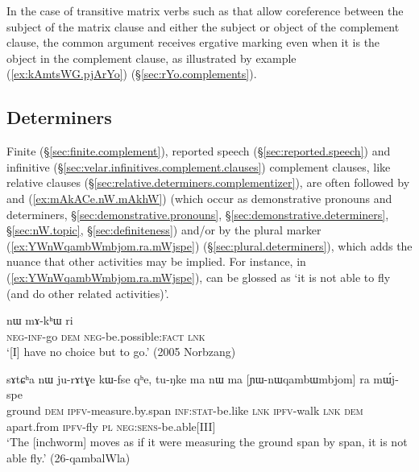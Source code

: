 In the case of transitive matrix verbs such as  that allow coreference between the subject of the matrix clause and either the subject or object of the complement clause, the common argument receives ergative marking even when it is the object in the complement clause, as illustrated by example (\ref{ex:kAmtsWG.pjArYo}) (§\ref{sec:rYo.complements}).

\subsection{Determiners} \label{sec:complement.determiner}
 
Finite (§\ref{sec:finite.complement}), reported speech (§\ref{sec:reported.speech}) and infinitive (§\ref{sec:velar.infinitives.complement.clauses}) complement clauses, like relative clauses (§\ref{sec:relative.determiners.complementizer}), are often followed by  and  (\ref{ex:mAkACe.nW.mAkhW})  (which occur as  demonstrative pronouns and determiners, §\ref{sec:demonstrative.pronouns}, §\ref{sec:demonstrative.determiners}, §\ref{sec:nW.topic}, §\ref{sec:definiteness}) and/or by the plural marker  (\ref{ex:YWnWqambWmbjom.ra.mWjspe}) (§\ref{sec:plural.determiners}), which adds the nuance that other activities may be implied. For instance, in (\ref{ex:YWnWqambWmbjom.ra.mWjspe}),  can be glossed as `it is not able to fly (and do other related activities)'.

 \begin{exe}
\ex \label{ex:mAkACe.nW.mAkhW}
\gll [mɤ-kɤ-ɕe] nɯ mɤ-kʰɯ ri \\
\textsc{neg}-\textsc{inf}-go \textsc{dem} \textsc{neg}-be.possible:\textsc{fact} \textsc{lnk} \\
\glt `[I] have no choice but to go.' (2005 Norbzang)
\end{exe}

 \begin{exe}
\ex \label{ex:YWnWqambWmbjom.ra.mWjspe}
\gll  sɤtɕʰa nɯ ju-rɤtɣe kɯ-fse qʰe, tu-ŋke ma nɯ ma [ɲɯ-nɯqambɯmbjom] ra mɯ́j-spe \\
ground \textsc{dem} \textsc{ipfv}-measure.by.span \textsc{inf}:\textsc{stat}-be.like \textsc{lnk} \textsc{ipfv}-walk \textsc{lnk} \textsc{dem} apart.from \textsc{ipfv}-fly \textsc{pl} \textsc{neg}:\textsc{sens}-be.able[III] \\
\glt `The [inchworm] moves as if it were measuring the ground span by span, it is not able fly.' (26-qambalWla)
\end{exe}
 
